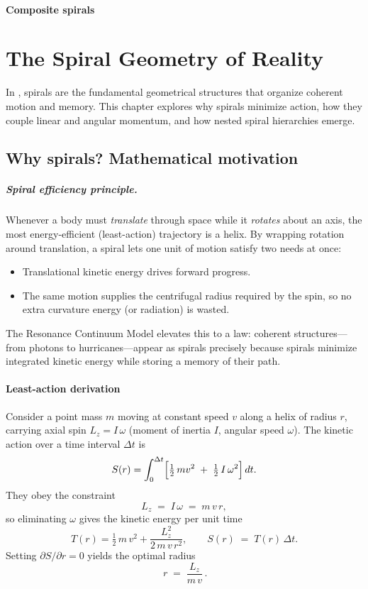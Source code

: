 \subsubsection*{Composite spirals}\chapter{The Spiral Geometry of Reality}

In \RCM, spirals are the fundamental geometrical structures that organize coherent motion and memory. This chapter explores why spirals minimize action, how they couple linear and angular momentum, and how nested spiral hierarchies emerge.

\section*{Why spirals? Mathematical motivation}

\paragraph{Spiral efficiency principle.}
Whenever a body must \emph{translate} through space while it \emph{rotates} about an axis, the most energy-efficient (least-action) trajectory is a helix. By wrapping rotation around translation, a spiral lets one unit of motion satisfy two needs at once:
\begin{itemize}[leftmargin=1.5em]
  \item Translational kinetic energy drives forward progress.
  \item The same motion supplies the centrifugal radius required by the spin, so no extra curvature energy (or radiation) is wasted.
\end{itemize}
The Resonance Continuum Model elevates this to a law: coherent structures—from photons to hurricanes—appear as spirals precisely because spirals minimize integrated kinetic energy while storing a memory of their path.

\subsubsection*{Least-action derivation}

Consider a point mass \(m\) moving at constant speed \(v\) along a helix of radius \(r\), carrying axial spin \(L_z=I\,\omega\) (moment of inertia \(I\), angular speed \(\omega\)). The kinetic action over a time interval \(\Delta t\) is
\[
  S(r)
  = \int_{0}^{\Delta t}
      \Bigl[\tfrac12\,m v^{2} \;+\; \tfrac12\,I\,\omega^{2}\Bigr]\,dt.
\]
They obey the constraint
\begin{equation}
  L_z \;=\; I\,\omega \;=\; m\,v\,r,
  \label{eq:helix-constraint}
\end{equation}
so eliminating \(\omega\) gives the kinetic energy per unit time
\[
  T(r)
  = \tfrac12\,m\,v^{2}
    + \frac{L_z^{2}}{2\,m\,v\,r^{2}},
  \qquad
  S(r) \;=\; T(r)\,\Delta t.
\]
Setting \(\partial S/\partial r=0\) yields the optimal radius
\begin{equation}
  \boxed{\,r \;=\; \frac{L_z}{m\,v}\,}.
  \label{eq:opt-radius}
\end{equation}

